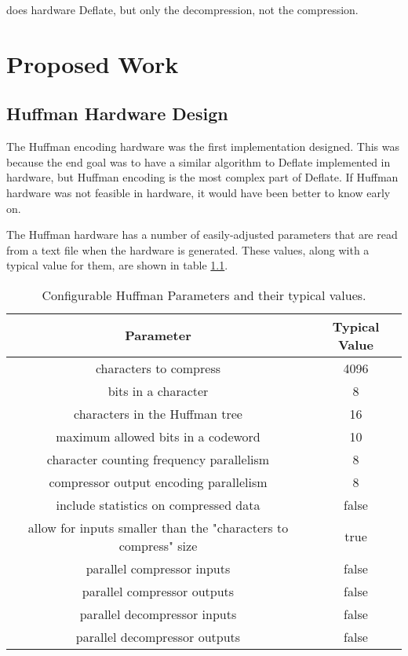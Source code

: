 \documentclass[doublespace,draft,nopageskip]{VTthesis} %
\begin{document}
\cite{deflatedecompression} does hardware Deflate, but only the decompression, not the compression.

\chapter{Proposed Work} \label{ch:proposed_work}
\section{Huffman Hardware Design}\label{se:huffman_hardware_design}
The Huffman encoding hardware was the first implementation designed. This was because the end goal was to have a similar algorithm to Deflate implemented in hardware, but Huffman encoding is the most complex part of Deflate. If Huffman hardware was not feasible in hardware, it would have been better to know early on.

The Huffman hardware has a number of easily-adjusted parameters that are read from a text file when the hardware is generated. These values, along with a typical value for them, are shown in table \ref{tab:huffman-configuration-table}.

\begin{table}[htb]
	\centering
	\caption{Configurable Huffman Parameters and their typical values.}
	\begin{tabular}{|c|c|}
	    \hline
	    Parameter & Typical Value \\
	    \hline
	    characters to compress & 4096 \\
	    \hline
	    bits in a character & 8 \\
	    \hline
	    characters in the Huffman tree & 16 \\
	    \hline
	    maximum allowed bits in a codeword & 10 \\
	    \hline
	    character counting frequency parallelism & 8 \\
	    \hline
	    compressor output encoding parallelism & 8 \\
	    \hline
	    include statistics on compressed data & false \\
	    \hline
	    allow for inputs smaller than the "characters to compress" size & true \\
	    \hline
	    parallel compressor inputs & false \\
	    \hline
	    parallel compressor outputs & false \\
	    \hline
	    parallel decompressor inputs & false \\ 
	    \hline
	    parallel decompressor outputs & false \\
	    \hline
	\end{tabular}
	\label{tab:huffman-configuration-table}
\end{table}
\end{document}
